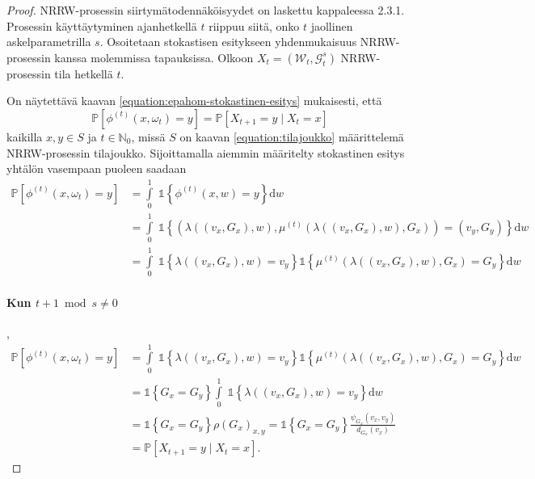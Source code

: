 \documentclass[finnish, 12pt, a4paper, sci, utf8, pdfa]{aaltothesis}
\newcommand{\N}{\mathbb{N}}
\newcommand{\Grandom}{\mathcal{G}}
\newcommand{\Wrandom}{\mathcal{W}}
\newcommand{\indicator}{\mathopen{\mathds{1}}}
\newcommand*{\prob}{\mathbb{P}}
\begin{document}
\begin{proof}
NRRW-prosessin siirtymätodennäköisyydet on laskettu kappaleessa 2.3.1. Prosessin käyttäytyminen ajanhetkellä $ t $ riippuu siitä, onko $ t $ jaollinen askelparametrilla $ s $. Osoitetaan stokastisen esitykseen yhdenmukaisuus NRRW-prosessin kanssa molemmissa tapauksissa. Olkoon $ X_{t} = (\Wrandom_{t}, \Grandom^{s}_{t}) $ NRRW-prosessin tila hetkellä $ t $. 

On näytettävä kaavan \ref{equation:epahom-stokastinen-esitys} mukaisesti, että
\[
   \prob \left[ \phi^{(t)}(x, \omega_{t}) = y \right] = \prob \left[ X_{t+1} = y \mid X_{t} = x \right] 
\]
kaikilla $ x, y \in S $ ja $ t \in \N_{0} $, missä $ S $ on kaavan \ref{equation:tilajoukko} määrittelemä NRRW-prosessin tilajoukko. Sijoittamalla aiemmin määritelty stokastinen esitys yhtälön vasempaan puoleen saadaan
\begin{align*}
   \prob \left[ \phi^{(t)}(x, \omega_{t}) = y \right] &= \int\limits_0^1 \; \indicator \left\{ \phi^{(t)}(x, w) = y \right\} \mathrm{d}w \\
                                                &= \int\limits_0^1 \; \indicator \left\{ \left( \lambda\left( (v_{x}, G_{x}), w \right), \mu^{(t)} \left( \lambda\left( (v_{x}, G_{x}), w \right), G_{x} \right) \right) = (v_{y}, G_{y}) \right\} \mathrm{d}w \\
                                                &= \int\limits_0^1 \; \indicator \left\{ \lambda\left( (v_{x}, G_{x}), w \right) = v_{y} \right\} \indicator \left\{ \mu^{(t)} \left( \lambda\left( (v_{x}, G_{x}), w \right), G_{x} \right) = G_{y} \right\} \mathrm{d}w
\end{align*}

\paragraph{Kun $ t + 1 \bmod s \neq 0 $},
\begin{align*}
   \prob \left[ \phi^{(t)}(x, \omega_{t}) = y \right] &= \int\limits_0^1 \; \indicator \left\{ \lambda\left( (v_{x}, G_{x}), w \right) = v_{y} \right\} \indicator \left\{ \mu^{(t)} \left( \lambda\left( (v_{x}, G_{x}), w \right), G_{x} \right) = G_{y} \right\} \mathrm{d}w \\
                                                &= \indicator \left\{ G_{x} = G_{y} \right\} \int\limits_0^1 \; \indicator \left\{ \lambda\left( (v_{x}, G_{x}), w \right) = v_{y} \right\} \mathrm{d}w \\
                                                &= \indicator \left\{ G_{x} = G_{y} \right\} \rho(G_{x})_{x,y} = \indicator \left\{ G_{x} = G_{y} \right\} \frac{\psi_{G_{x}}(v_{x}, v_{y})}{d_{G_{x}}(v_{x})} \\
                                                &= \prob \left[ X_{t+1} = y \mid X_{t} = x \right].
\end{align*}


\end{proof}
\end{document}
